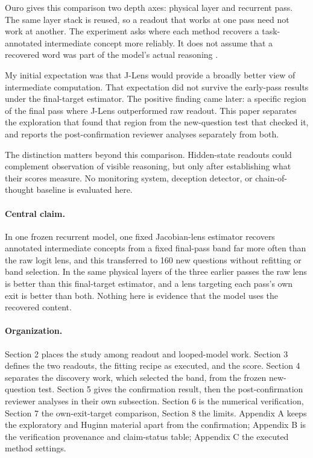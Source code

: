 Ouro gives this comparison two depth axes: physical layer and recurrent
pass. The same layer stack is reused, so a readout that works at one
pass need not work at another. The experiment asks where each method
recovers a task-annotated intermediate concept more reliably. It does
not assume that a recovered word was part of the model's actual
reasoning \citep{zhu2025ouro}.

My initial expectation was that J-Lens would provide a broadly better
view of intermediate computation. That expectation did not survive the
early-pass results under the final-target estimator. The positive
finding came later: a specific region of the final pass where J-Lens
outperformed raw readout. This paper separates the exploration that
found that region from the new-question test that checked it, and
reports the post-confirmation reviewer analyses separately from both.

The distinction matters beyond this comparison. Hidden-state readouts
could complement observation of visible reasoning, but only after
establishing what their scores measure. No monitoring system, deception
detector, or chain-of-thought baseline is evaluated here.

\paragraph{Central claim.}

In one frozen recurrent model, one fixed Jacobian-lens estimator
recovers annotated intermediate concepts from a fixed final-pass band
far more often than the raw logit lens, and this transferred to 160 new
questions without refitting or band selection. In the same physical
layers of the three earlier passes the raw lens is better than this
final-target estimator, and a lens targeting each pass's own exit is
better than both. Nothing here is evidence that the model uses the
recovered content.

\paragraph{Organization.}

Section 2 places the study among readout and looped-model work. Section
3 defines the two readouts, the fitting recipe as executed, and the
score. Section 4 separates the discovery work, which selected the band,
from the frozen new-question test. Section 5 gives the confirmation
result, then the post-confirmation reviewer analyses in their own
subsection. Section 6 is the numerical verification, Section 7 the
own-exit-target comparison, Section 8 the limits. Appendix A keeps the
exploratory and Huginn material apart from the confirmation; Appendix B
is the verification provenance and claim-status table; Appendix C the
executed method settings.

